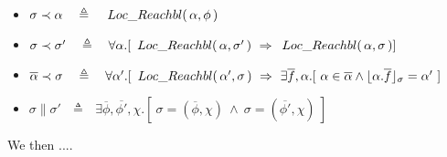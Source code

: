  
 
\begin{definition}
$~ $ %
\label{def:prec}
\begin{itemize}
\item
$\sigma \prec \alpha\ \ \ \triangleq\ \ \ \LRelevant {\alpha} {\phi}$
\item
$\sigma \prec \sigma'\ \ \ \triangleq\ \ \  \forall \alpha.[\ \LRelevant {\alpha} {\sigma'} \ \Rightarrow \  \LRelevant {\alpha} {\sigma}] $
\item
$\overline \alpha \prec \sigma \ \ \ \triangleq\ \ \  \forall \alpha'.[\ \LRelevant {\alpha'} {\sigma} \ \Rightarrow \  \exists \overline f, \alpha. [\ \alpha \in \overline \alpha \wedge 
\interpret \sigma {\alpha.{\overline f}} = \alpha' \ ]$
\item
$\sigma \parallel \sigma'  \ \ \ \triangleq\ \ \ \exists \overline \phi,  \overline {\phi'}, \chi. [\ \sigma=( \overline \phi, \chi )\ \wedge\ 
\sigma=( \overline {\phi'}, \chi )\ ]$
\end{itemize}
\end{definition}

We then ....

